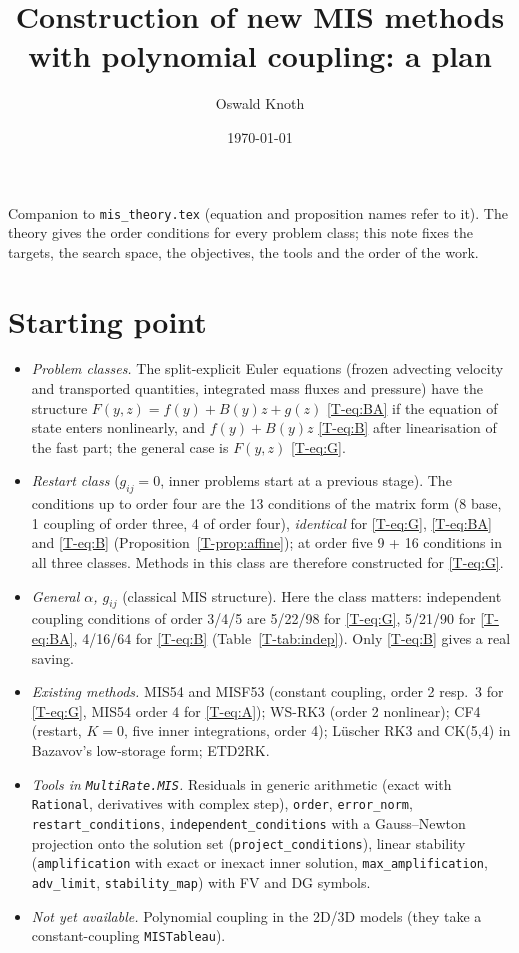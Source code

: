 \documentclass[11pt,a4paper]{article}
\title{Construction of new MIS methods with polynomial coupling: a plan}
\author{Oswald Knoth}
\date{\today}
\begin{document}
\sloppy
\maketitle

Companion to \texttt{mis\_theory.tex} (equation and proposition names refer to it). The theory gives the order
conditions for every problem class; this note fixes the targets, the search space, the objectives, the tools and the
order of the work.

\section{Starting point}

\begin{itemize}
\item \emph{Problem classes.} The split-explicit Euler equations (frozen advecting velocity and transported quantities,
  integrated mass fluxes and pressure) have the structure $F(y,z)=f(y)+B(y)z+g(z)$ \eqref{T-eq:BA} if the equation of
  state enters nonlinearly, and $f(y)+B(y)z$ \eqref{T-eq:B} after linearisation of the fast part; the general case is
  $F(y,z)$ \eqref{T-eq:G}.
\item \emph{Restart class} ($g_{ij}=0$, inner problems start at a previous stage). The conditions up to order four are the
  13 conditions of the matrix form (8 base, 1 coupling of order three, 4 of order four), \emph{identical} for
  \eqref{T-eq:G}, \eqref{T-eq:BA} and \eqref{T-eq:B} (Proposition~\ref{T-prop:affine}); at order five 9 + 16 conditions in all
  three classes. Methods in this class are therefore constructed for \eqref{T-eq:G}.
\item \emph{General $\alpha$, $g_{ij}$} (classical MIS structure). Here the class matters: independent coupling conditions
  of order 3/4/5 are 5/22/98 for \eqref{T-eq:G}, 5/21/90 for \eqref{T-eq:BA}, 4/16/64 for \eqref{T-eq:B}
  (Table~\ref{T-tab:indep}). Only \eqref{T-eq:B} gives a real saving.
\item \emph{Existing methods.} MIS54 and MISF53 (constant coupling, order 2 resp.\ 3 for \eqref{T-eq:G}, MIS54 order 4 for
  \eqref{T-eq:A}); WS-RK3 (order 2 nonlinear); CF4 (restart, $K=0$, five inner integrations, order 4); Lüscher RK3 and
  CK(5,4) in Bazavov's low-storage form; ETD2RK.
\item \emph{Tools in \texttt{MultiRate.MIS}.} Residuals in generic arithmetic (exact with \texttt{Rational}, derivatives
  with complex step), \texttt{order}, \texttt{error\_norm}, \texttt{restart\_conditions}, \texttt{independent\_conditions}
  with a Gauss--Newton projection onto the solution set (\texttt{project\_conditions}), linear stability
  (\texttt{amplification} with exact or inexact inner solution, \texttt{max\_amplification}, \texttt{adv\_limit},
  \texttt{stability\_map}) with FV and DG symbols.
\item \emph{Not yet available.} Polynomial coupling in the 2D/3D models (they take a constant-coupling
  \texttt{MISTableau}).
\end{itemize}
\end{document}
